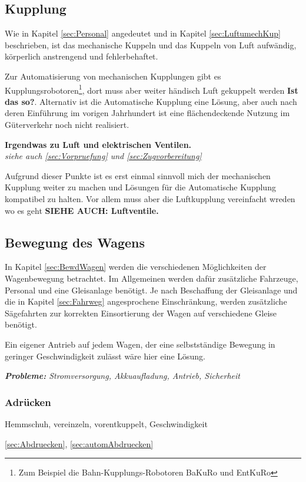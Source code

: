 \subsection{Kupplung}
Wie in Kapitel \ref{sec:Personal} angedeutet und in Kapitel \ref{sec:LuftumechKup} beschrieben, ist das mechanische Kuppeln und das Kuppeln von Luft aufwändig, körperlich anstrengend und fehlerbehaftet. \par
Zur Automatisierung von mechanischen Kupplungen gibt es Kupplungsrobotoren\footnote{Zum Beispiel die Bahn-Kupplungs-Robotoren BaKuRo und EntKuRo}, dort muss aber weiter händisch Luft gekuppelt werden \textbf{Ist das so?}. Alternativ ist die Automatische Kupplung eine Lösung, aber auch nach deren Einführung im vorigen Jahrhundert ist eine flächendeckende Nutzung im Güterverkehr noch nicht realisiert.\par
\textbf{Irgendwas zu Luft und elektrischen Ventilen.}\\
\textit{siehe auch \ref{sec:Vorpruefung} und \ref{sec:Zugvorbereitung}}
\par
Aufgrund dieser Punkte ist es erst einmal sinnvoll mich der mechanischen Kupplung weiter zu machen und Lösungen für die Automatische Kupplung kompatibel zu halten. Vor allem muss aber die Luftkupplung vereinfacht wreden wo es geht \textbf{ SIEHE AUCH: Luftventile.}

\subsection{Bewegung des Wagens}
In Kapitel \ref{sec:BewdWagen} werden die verschiedenen Möglichkeiten der Wagenbewegung betrachtet. Im Allgemeinen werden dafür zusätzliche Fahrzeuge, Personal und eine Gleisanlage benötigt. Je nach Beschaffung der Gleisanlage und die in Kapitel \ref{sec:Fahrweg} angesprochene Einschränkung, werden zusätzliche Sägefahrten zur korrekten Einsortierung der Wagen auf verschiedene Gleise benötigt. \par
Ein eigener Antrieb auf jedem Wagen, der eine selbstständige Bewegung in geringer Geschwindigkeit zulässt wäre hier eine Lösung.\par
\textit{\textbf{Probleme:} Stromversorgung, Akkuaufladung, Antrieb, Sicherheit}
\subsubsection{Adrücken}
Hemmschuh, vereinzeln, vorentkuppelt, Geschwindigkeit\par
\ref{sec:Abdruecken}, \ref{sec:automAbdruecken}
